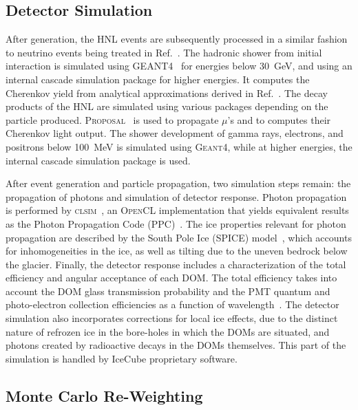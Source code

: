\documentclass[
    aps,
    prd,
    reprint,
    amsmath,
    amssymb,
    nofootinbib,
    superscriptaddress,
    floatfix
]{revtex4-2}
\newcommand{\gev}{\giga\electronvolt}
\newcommand{\mev}{\mega\electronvolt}
\begin{document}
\subsection{Detector Simulation}

After generation, the HNL events are subsequently processed in a similar fashion to neutrino events being treated in Ref.~\cite{IceCubeCollaboration:2023wtb}. The hadronic shower from initial interaction is simulated using \textsc{GEANT4}~\cite{GEANT4:2002zbu} for energies below \SI{30}{\gev}, and using an internal cascade simulation package for higher energies. It computes the Cherenkov yield from analytical approximations derived in Ref.~\cite{Radel:2012kw}.
The decay products of the HNL are simulated using various packages depending on the particle produced.
\textsc{Proposal}~\cite{Koehne:2013gpa} is used to propagate $\mu$'s and to computes their Cherenkov light output.
The shower development of gamma rays, electrons, and positrons below \SI{100}{\mev} is simulated using \textsc{Geant4}, while at higher energies, the internal cascade simulation package is used.

After event generation and particle propagation, two simulation steps remain: the propagation of photons and simulation of detector response.
Photon propagation is performed by \textsc{clsim}~\cite{clsim}, an \textsc{OpenCL} implementation that yields equivalent results as the Photon Propagation Code (\textsc{PPC})~\cite{Chirkin:2019rcj}.
The ice properties relevant for photon propagation are described by the South Pole Ice (SPICE) model~\cite{IceCube:2013llx}, which accounts for inhomogeneities in the ice, as well as tilting due to the uneven bedrock below the glacier.
Finally, the detector response includes a characterization of the total efficiency and angular acceptance of each DOM.
The total efficiency takes into account the DOM glass transmission probability and the PMT quantum and photo-electron collection efficiencies as a function of wavelength~\cite{ABBASI2009294_data_acquisition}.
The detector simulation also incorporates corrections for local ice effects, due to the distinct nature of refrozen ice in the bore-holes in which the DOMs are situated, and photons created by radioactive decays in the DOMs themselves.
This part of the simulation is handled by IceCube proprietary software.


\subsection{Monte Carlo Re-Weighting} \label{sec:weighting}
\end{document}
